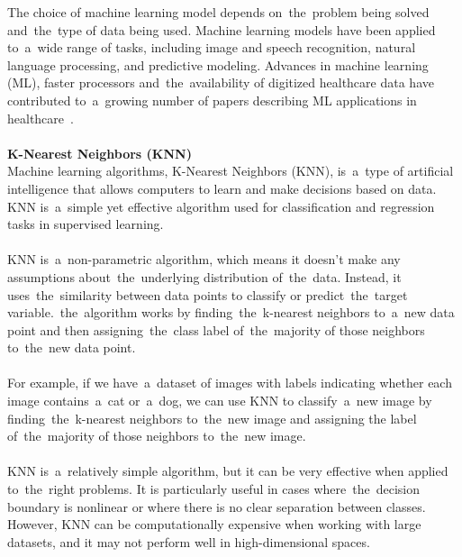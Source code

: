 The choice of machine learning model depends on~the~problem being solved and~the~type of data being used. Machine
learning models have been applied to~a~wide range of tasks, including image and speech recognition, natural language
processing, and predictive modeling. Advances in machine learning (ML), faster processors and~the~availability of
digitized healthcare data have contributed to~a~growing number of papers describing ML applications in healthcare~\cite{Chen}.\\
\\
\textbf{K-Nearest Neighbors (KNN)} \label{sec:knn}\\
Machine learning algorithms, K-Nearest Neighbors (KNN), is~a~type of artificial intelligence that allows
computers to learn and make decisions based on data. KNN is~a~simple yet effective algorithm used for
classification and regression tasks in supervised learning.\\
\\
KNN is~a~non-parametric algorithm, which means it doesn't make any assumptions about~the~underlying
distribution of~the~data. Instead, it uses~the~similarity between data points to classify or predict~the~target
variable.~the~algorithm works by finding~the~k-nearest neighbors to~a~new data point and then assigning~the~class
label of~the~majority of those neighbors to~the~new data point.\\
\\
For example, if we have~a~dataset of images with labels indicating whether each image contains~a~cat or~a~dog,
we can use KNN to classify~a~new image by finding~the~k-nearest neighbors to~the~new image and assigning the
label of~the~majority of those neighbors to~the~new image.\\
\\
KNN is~a~relatively simple algorithm, but it can be very effective when applied to~the~right problems.
It is particularly useful in cases where~the~decision boundary is nonlinear or where there is no clear
separation between classes. However, KNN can be computationally expensive when working with large datasets, and
it may not perform well in high-dimensional spaces.


